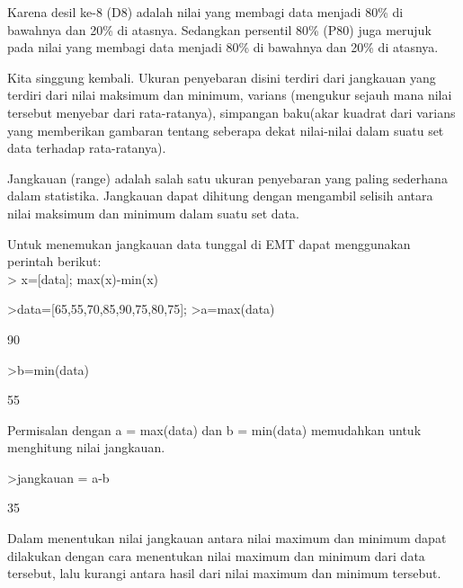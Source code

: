 \documentclass[a4paper,10pt]{article}
\begin{document}
\begin{eulernotebook}
\begin{eulercomment}
\begin{eulercomment}
\begin{eulercomment}
Karena desil ke-8 (D8) adalah nilai yang membagi data menjadi 80\% di
bawahnya dan 20\% di atasnya. Sedangkan persentil 80\% (P80) juga
merujuk pada nilai yang membagi data menjadi 80\% di bawahnya dan 20\%
di atasnya.
\end{eulercomment}
\begin{eulercomment}
Kita singgung kembali. Ukuran penyebaran disini terdiri dari jangkauan
yang terdiri dari nilai maksimum dan minimum, varians (mengukur sejauh
mana nilai tersebut menyebar dari rata-ratanya), simpangan baku(akar
kuadrat dari varians yang memberikan gambaran tentang seberapa dekat
nilai-nilai dalam suatu set data terhadap rata-ratanya).

\end{eulercomment}
\begin{eulercomment}
Jangkauan (range) adalah salah satu ukuran penyebaran yang paling
sederhana dalam statistika. Jangkauan dapat dihitung dengan mengambil
selisih antara nilai maksimum dan minimum dalam suatu set data.

Untuk menemukan jangkauan data tunggal di EMT dapat menggunakan
perintah berikut:\\
\textgreater{} x=[data]; max(x)-min(x)
\end{eulercomment}
\begin{eulerprompt}
>data=[65,55,70,85,90,75,80,75];
>a=max(data)
\end{eulerprompt}
\begin{euleroutput}
  90
\end{euleroutput}
\begin{eulerprompt}
>b=min(data)
\end{eulerprompt}
\begin{euleroutput}
  55
\end{euleroutput}
\begin{eulercomment}
Permisalan dengan a = max(data) dan b = min(data) memudahkan untuk
menghitung nilai jangkauan.
\end{eulercomment}
\begin{eulerprompt}
>jangkauan = a-b
\end{eulerprompt}
\begin{euleroutput}
  35
\end{euleroutput}
\begin{eulercomment}
Dalam menentukan nilai jangkauan antara nilai maximum dan minimum
dapat dilakukan dengan cara menentukan nilai maximum dan minimum dari
data tersebut, lalu kurangi antara hasil dari nilai maximum dan
minimum tersebut.


\end{eulercomment}
\end{eulercomment}
\end{eulercomment}
\end{eulernotebook}
\end{document}
